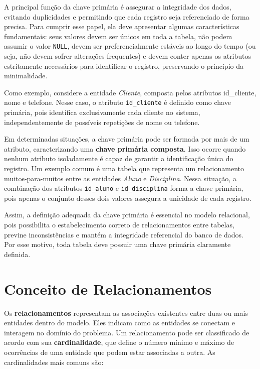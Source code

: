 A principal função da chave primária é assegurar a integridade dos dados, evitando duplicidades e permitindo que cada registro seja referenciado de forma precisa. Para cumprir esse papel, ela deve apresentar algumas características fundamentais: seus valores devem ser únicos em toda a tabela, não podem assumir o valor \texttt{NULL}, devem ser preferencialmente estáveis ao longo do tempo (ou seja, não devem sofrer alterações frequentes) e devem conter apenas os atributos estritamente necessários para identificar o registro, preservando o princípio da minimalidade.

Como exemplo, considere a entidade \textit{Cliente}, composta pelos atributos id\_cliente, nome e telefone. Nesse caso, o atributo \texttt{id\_cliente} é definido como chave primária, pois identifica exclusivamente cada cliente no sistema, independentemente de possíveis repetições de nome ou telefone.

Em determinadas situações, a chave primária pode ser formada por mais de um atributo, caracterizando uma \textbf{chave primária composta}. Isso ocorre quando nenhum atributo isoladamente é capaz de garantir a identificação única do registro. Um exemplo comum é uma tabela que representa um relacionamento muitos-para-muitos entre as entidades \textit{Aluno} e \textit{Disciplina}. Nessa situação, a combinação dos atributos \texttt{id\_aluno} e \texttt{id\_disciplina} forma a chave primária, pois apenas o conjunto desses dois valores assegura a unicidade de cada registro.

Assim, a definição adequada da chave primária é essencial no modelo relacional, pois possibilita o estabelecimento correto de relacionamentos entre tabelas, previne inconsistências e mantém a integridade referencial do banco de dados. Por esse motivo, toda tabela deve possuir uma chave primária claramente definida.

\section{Conceito de Relacionamentos}

Os \textbf{relacionamentos} representam as associações existentes entre duas ou mais entidades dentro do modelo. Eles indicam como as entidades se conectam e interagem no domínio do problema. Um relacionamento pode ser classificado de acordo com sua \textbf{cardinalidade}, que define o número mínimo e máximo de ocorrências de uma entidade que podem estar associadas a outra. As cardinalidades mais comuns são:

